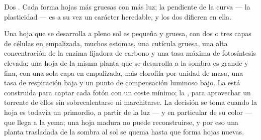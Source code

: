 \begin{omfigure}

{\small Dos . Cada  forma hojas más gruesas con
más luz; la pendiente de la curva --- la plasticidad --- es a su vez un
carácter heredable, y los dos  difieren en ella.}
\end{omfigure}

\begin{proposition}\label{prop:b2:plant-plasticity:sunshade}
Una hoja que se desarrolla a pleno sol es pequeña y gruesa, con dos o tres
capas de células en empalizada, muchos estomas, una cutícula gruesa, una
alta concentración de la enzima fijadora de carbono y una tasa máxima de
fotosíntesis elevada; una hoja de la misma planta que se desarrolla a la
sombra es grande y fina, con una sola capa en empalizada, más clorofila
por unidad de masa, una tasa de respiración baja y un punto de
compensación luminoso bajo. La  está construida para
captar cada fotón con un coste mínimo; la , para aprovechar un
torrente de ellos sin sobrecalentarse ni marchitarse. La decisión se toma
cuando la hoja es todavía un primordio, a partir de la luz --- y en
particular de su color --- que llega a la yema; una hoja madura no puede
reconstruirse, y por eso una planta trasladada de la sombra al sol se
quema hasta que forma hojas nuevas.
\end{proposition}

